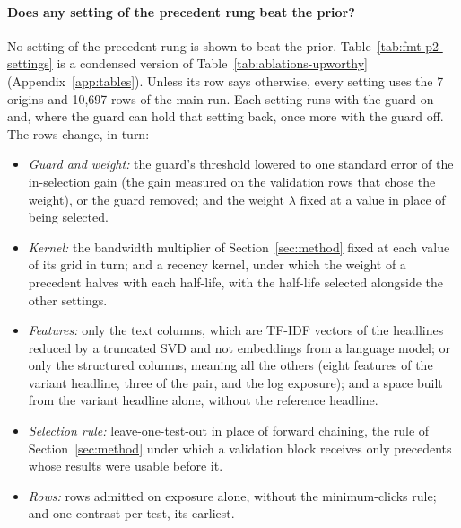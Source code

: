 \paragraph{Does any setting of the precedent rung beat the prior?}
No setting of the precedent rung is shown to beat the prior. Table~\ref{tab:fmt-p2-settings} is a condensed version of Table~\ref{tab:ablations-upworthy} (Appendix~\ref{app:tables}). Unless its row says otherwise, every setting uses the 7 origins and 10,697 rows of the main run. Each setting runs with the guard on and, where the guard can hold that setting back, once more with the guard off.
The rows change, in turn:
\begin{itemize}
\item \emph{Guard and weight:} the guard's threshold lowered to one standard error of the in-selection gain (the gain measured on the validation rows that chose the weight), or the guard removed; and the weight $\lambda$ fixed at a value in place of being selected.
\item \emph{Kernel:} the bandwidth multiplier of Section~\ref{sec:method} fixed at each value of its grid in turn; and a recency kernel, under which the weight of a precedent halves with each half-life, with the half-life selected alongside the other settings.
\item \emph{Features:} only the text columns, which are TF-IDF vectors of the headlines reduced by a truncated SVD and not embeddings from a language model; or only the structured columns, meaning all the others (eight features of the variant headline, three of the pair, and the log exposure); and a space built from the variant headline alone, without the reference headline.
\item \emph{Selection rule:} leave-one-test-out in place of forward chaining, the rule of Section~\ref{sec:method} under which a validation block receives only precedents whose results were usable before it.
\item \emph{Rows:} rows admitted on exposure alone, without the minimum-clicks rule; and one contrast per test, its earliest.
\end{itemize}

